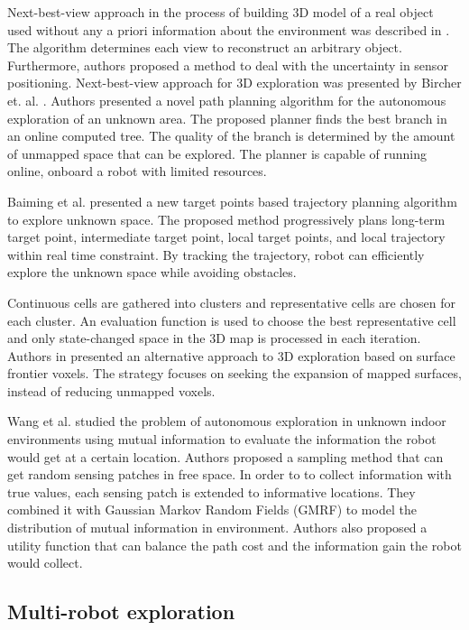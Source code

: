 Next-best-view approach in the process of building 3D model of a real object used without any a priori information about the environment was described in \cite{VasquezGomez2014}. The algorithm determines each view to reconstruct an arbitrary object. Furthermore, authors proposed a method to deal with the uncertainty in sensor positioning.
Next-best-view approach for 3D exploration was presented by Bircher et. al. \cite{Bircher2016}. Authors presented a novel path planning algorithm for the autonomous exploration of an unknown area. The proposed planner finds the best branch in an online computed tree. The quality of the branch is determined by the amount of unmapped space that can be explored. The planner is capable of running online, onboard a robot with limited resources.

Baiming et al. \cite{Baiming2018} presented a new target points based trajectory planning algorithm to explore unknown space. The proposed method progressively plans long-term target point, intermediate target point, local target points, and local trajectory within real time constraint. By tracking the trajectory, robot can efficiently explore the unknown space while avoiding obstacles.

Continuous cells are gathered into clusters and representative cells are chosen for each cluster. An evaluation function is used to choose the best representative cell and only state-changed space in the 3D map is processed in each iteration.
Authors in \cite{Senarathne2016} presented an alternative approach to 3D exploration based on surface frontier voxels. The strategy focuses on seeking the expansion of mapped surfaces, instead of reducing unmapped voxels. 

Wang et al. \cite{Wang2018} studied the problem of autonomous exploration in unknown indoor environments using mutual information to evaluate the information the robot would get at a certain location. Authors proposed a sampling method that can get random sensing patches in free space. In order to to collect information with true values, each sensing patch is extended to informative locations. They combined it with Gaussian Markov Random Fields (GMRF) to model the distribution of mutual information in environment.  Authors also proposed a utility function that can balance the path cost and the information gain the robot would collect.



\subsection{Multi-robot exploration}

